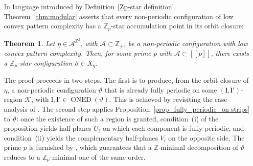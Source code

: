 \documentclass[12pt]{amsart}
\numberwithin{equation}{section}
\newtheorem{theorem}{Theorem}[section]
\DeclareMathOperator{\nexpd}{ONED}
\newcommand{\bb}[1]{\mathbb{#1}}
\newcommand{\llb}{[\![}
\newcommand{\rrb}{]\!]}
\begin{document}
In language introduced by Definition~\ref{Zp-star definition}, Theorem~\ref{thm:modular} asserts that every non-periodic configuration of low convex pattern complexity has a $\mathbb Z_p$-star accumulation point in its orbit closure:

\begin{theorem}\label{thm:modular_reformulated}
Let $\eta \in \mathcal{A}^{\bb{Z}^2}$, with \(\mathcal{A} \subset \bb{Z}_+\), be a non-periodic configuration with low convex pattern complexity. Then, for some prime $p$ with $\mathcal{A} \subset \llb p \rrb$, there exists a $\bb{Z}_p$-star configuration $\vartheta \in X_\eta$. 
\end{theorem}

The proof proceeds in two steps. The first is to produce, from the orbit closure of $ \eta $, a non-periodic configuration $\vartheta$ that is already fully periodic on some $(\pmb{l},\pmb{l}')$-region $\mathcal K$, with $\pmb{l},\pmb{l}' \in \nexpd(\vartheta)$. This is achieved by revisiting the case analysis of \cite[Lemma~4.6]{Colle23}. The second step applies Proposition~\ref{prop_fully_periodic_on strips} to $\vartheta$: once the existence of such a region is granted, condition~(i) of the proposition yields half-planes $U_i$ on which each component is fully periodic, and condition~(ii) yields the complementary half-planes $V_i$ on the opposite side. The prime $p$ is furnished by \cite[Theorem~1.5]{Colle22}, which guarantees that a $\mathbb Z$-minimal decomposition of $\vartheta$ reduces to a $\mathbb Z_p$-minimal one of the same order.
\end{document}
